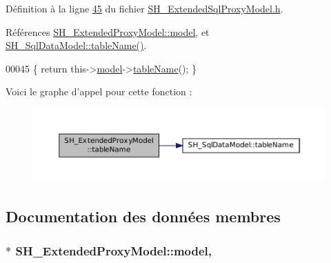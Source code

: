 Définition à la ligne \hyperlink{SH__ExtendedSqlProxyModel_8h_source_l00045}{45} du fichier \hyperlink{SH__ExtendedSqlProxyModel_8h_source}{S\-H\-\_\-\-Extended\-Sql\-Proxy\-Model.\-h}.



Références \hyperlink{classSH__ExtendedProxyModel_a8c8b8930c6b1abd9bbb1dce1fdc9690b}{S\-H\-\_\-\-Extended\-Proxy\-Model\-::model}, et \hyperlink{classSH__SqlDataModel_afced07f7b9e6fecd349a5428a1a4615e}{S\-H\-\_\-\-Sql\-Data\-Model\-::table\-Name()}.


\begin{DoxyCode}
00045 \{ \textcolor{keywordflow}{return} this->\hyperlink{classSH__ExtendedProxyModel_a8c8b8930c6b1abd9bbb1dce1fdc9690b}{model}->\hyperlink{classSH__SqlDataModel_afced07f7b9e6fecd349a5428a1a4615e}{tableName}(); \}
\end{DoxyCode}


Voici le graphe d'appel pour cette fonction \-:\nopagebreak
\begin{figure}[H]
\begin{center}
\leavevmode
\includegraphics[width=350pt]{classSH__ExtendedProxyModel_abb133e196ca7cf90b9c9b57263e898d6_cgraph}
\end{center}
\end{figure}




\subsection{Documentation des données membres}
\hypertarget{classSH__ExtendedProxyModel_a8c8b8930c6b1abd9bbb1dce1fdc9690b}{
\subsubsection[{model}]{$\ast$ S\-H\-\_\-\-Extended\-Proxy\-Model\-::model\hspace{0.3cm}{\ttfamily [protected]}, {\ttfamily [inherited]}}}\label{classSH__ExtendedProxyModel_a8c8b8930c6b1abd9bbb1dce1fdc9690b}


